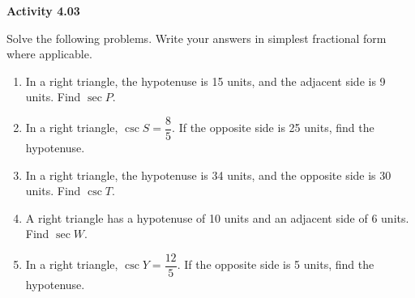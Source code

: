 \vspace{0.3ex}
\noindent\textbf{Activity 4.03}

\vspace{0.2ex}

Solve the following problems. Write your answers in simplest fractional form where applicable.

\begin{enumerate}
    \item In a right triangle, the hypotenuse is 15 units, and the adjacent side is 9 units. Find $\sec P$.
    \item In a right triangle, $\csc S = \dfrac{8}{5}$. If the opposite side is 25 units, find the hypotenuse.
    \item In a right triangle, the hypotenuse is 34 units, and the opposite side is 30 units. Find $\csc T$.
    \item A right triangle has a hypotenuse of 10 units and an adjacent side of 6 units. Find $\sec W$.
    \item In a right triangle, $\csc Y = \dfrac{12}{5}$. If the opposite side is 5 units, find the hypotenuse.
\end{enumerate}
